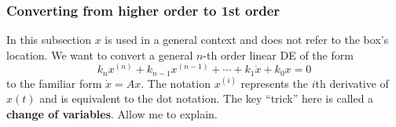 \documentclass[11pt, oneside]{article}   	%
\begin{document}
\subsubsection*{Converting from higher order to 1st order}

In this subsection $x$ is used in a general context and does not refer to the box's location.
We want to convert a general $n$-th order linear DE of the form
\begin{equation} \label{eq:nthOrderDE}
  k_n x^{(n)}
  + k_{n-1} x^{(n-1)}
  + \cdots
  + k_{1} \dot{x}
  + k_{0} x
  = 0
\end{equation}
to the familiar form $\dot{x} = Ax$.
The notation $x^{(i)}$ represents the $i$th derivative of $x(t)$ and is equivalent to the dot notation.
The key ``trick'' here is called a \textbf{change of variables}.
Allow me to explain.
\end{document}
